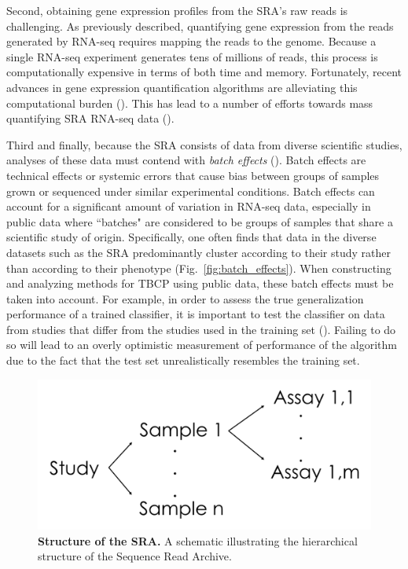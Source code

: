 Second, obtaining gene expression profiles from the SRA's raw reads is challenging. As previously described, quantifying gene expression from the reads generated by RNA-seq requires mapping the reads to the genome.  Because a single RNA-seq experiment generates tens of millions of reads, this process is computationally expensive in terms of both time and memory.  Fortunately, recent advances in gene expression quantification algorithms are alleviating this computational burden (\citealp{Nellore2017, Patro2017, Bray2016}). This has lead to a number of efforts towards mass quantifying SRA RNA-seq data (\citealp{Lachmann2018, ColladoTorres2017}).

Third and finally, because the SRA consists of data from diverse scientific studies, analyses of these data must contend with \textit{batch effects} (\citealp{Leek2010}). Batch effects are technical effects or systemic errors that cause bias between groups of samples grown or sequenced under similar experimental conditions.  Batch effects can account for a significant amount of variation in RNA-seq data, especially in public data where ``batches" are considered to be groups of samples that share a scientific study of origin. Specifically, one often finds that data in the diverse datasets such as the SRA predominantly cluster according to their study rather than according to their phenotype (Fig.~\ref{fig:batch_effects}).  When constructing and analyzing methods for TBCP using public data, these batch effects must be taken into account.  For example, in order to assess the true generalization performance of a trained classifier, it is important to test the classifier on data from studies that differ from the studies used in the training set  (\citealp{Bernau2014}). Failing to do so will lead to an overly optimistic measurement of performance of the algorithm due to the fact that the test set unrealistically resembles the training set. 

\begin{figure}[!tpb]
\centerline{\includegraphics[scale=0.4]{figures/SRAStructure.png}}
\caption{\textbf{Structure of the SRA.} A schematic illustrating the hierarchical structure of the Sequence Read Archive.}
\label{fig:sra_structure}
\end{figure}

